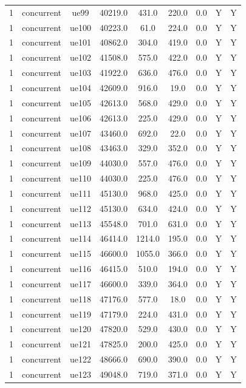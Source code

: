 \begin{table}[ht]
\begin{tabular}{|c|c|c|c|c|c|c|c|c|}
1 & concurrent & ue99 & 40219.0 & 431.0 & 220.0 & 0.0 & Y & Y \\
1 & concurrent & ue100 & 40223.0 & 61.0 & 224.0 & 0.0 & Y & Y \\
1 & concurrent & ue101 & 40862.0 & 304.0 & 419.0 & 0.0 & Y & Y \\
1 & concurrent & ue102 & 41508.0 & 575.0 & 422.0 & 0.0 & Y & Y \\
1 & concurrent & ue103 & 41922.0 & 636.0 & 476.0 & 0.0 & Y & Y \\
1 & concurrent & ue104 & 42609.0 & 916.0 & 19.0 & 0.0 & Y & Y \\
1 & concurrent & ue105 & 42613.0 & 568.0 & 429.0 & 0.0 & Y & Y \\
1 & concurrent & ue106 & 42613.0 & 225.0 & 429.0 & 0.0 & Y & Y \\
1 & concurrent & ue107 & 43460.0 & 692.0 & 22.0 & 0.0 & Y & Y \\
1 & concurrent & ue108 & 43463.0 & 329.0 & 352.0 & 0.0 & Y & Y \\
1 & concurrent & ue109 & 44030.0 & 557.0 & 476.0 & 0.0 & Y & Y \\
1 & concurrent & ue110 & 44030.0 & 225.0 & 476.0 & 0.0 & Y & Y \\
1 & concurrent & ue111 & 45130.0 & 968.0 & 425.0 & 0.0 & Y & Y \\
1 & concurrent & ue112 & 45130.0 & 634.0 & 424.0 & 0.0 & Y & Y \\
1 & concurrent & ue113 & 45548.0 & 701.0 & 631.0 & 0.0 & Y & Y \\
1 & concurrent & ue114 & 46414.0 & 1214.0 & 195.0 & 0.0 & Y & Y \\
1 & concurrent & ue115 & 46600.0 & 1055.0 & 366.0 & 0.0 & Y & Y \\
1 & concurrent & ue116 & 46415.0 & 510.0 & 194.0 & 0.0 & Y & Y \\
1 & concurrent & ue117 & 46600.0 & 339.0 & 364.0 & 0.0 & Y & Y \\
1 & concurrent & ue118 & 47176.0 & 577.0 & 18.0 & 0.0 & Y & Y \\
1 & concurrent & ue119 & 47179.0 & 224.0 & 431.0 & 0.0 & Y & Y \\
1 & concurrent & ue120 & 47820.0 & 529.0 & 430.0 & 0.0 & Y & Y \\
1 & concurrent & ue121 & 47825.0 & 200.0 & 425.0 & 0.0 & Y & Y \\
1 & concurrent & ue122 & 48666.0 & 690.0 & 390.0 & 0.0 & Y & Y \\
1 & concurrent & ue123 & 49048.0 & 719.0 & 371.0 & 0.0 & Y & Y \\

\end{tabular}
\end{table}

